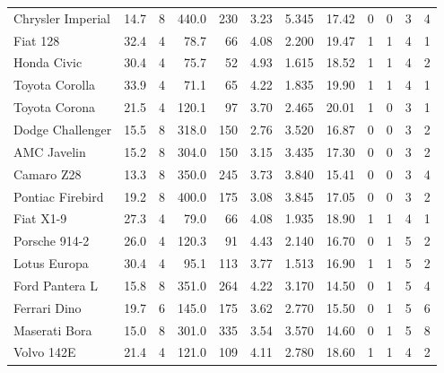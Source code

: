 \documentclass[aoas]{imsart}
\numberwithin{equation}{section}
\theoremstyle{plain}
\theoremstyle{remark}
\begin{document}
\begin{table}
\begin{tabular}[t]{lrrrrrrrrrrr}
Chrysler Imperial & 14.7 & 8 & 440.0 & 230 & 3.23 & 5.345 & 17.42 & 0 & 0 & 3 & 4\\
Fiat 128 & 32.4 & 4 & 78.7 & 66 & 4.08 & 2.200 & 19.47 & 1 & 1 & 4 & 1\\
Honda Civic & 30.4 & 4 & 75.7 & 52 & 4.93 & 1.615 & 18.52 & 1 & 1 & 4 & 2\\
Toyota Corolla & 33.9 & 4 & 71.1 & 65 & 4.22 & 1.835 & 19.90 & 1 & 1 & 4 & 1\\
Toyota Corona & 21.5 & 4 & 120.1 & 97 & 3.70 & 2.465 & 20.01 & 1 & 0 & 3 & 1\\
Dodge Challenger & 15.5 & 8 & 318.0 & 150 & 2.76 & 3.520 & 16.87 & 0 & 0 & 3 & 2\\
AMC Javelin & 15.2 & 8 & 304.0 & 150 & 3.15 & 3.435 & 17.30 & 0 & 0 & 3 & 2\\
Camaro Z28 & 13.3 & 8 & 350.0 & 245 & 3.73 & 3.840 & 15.41 & 0 & 0 & 3 & 4\\
Pontiac Firebird & 19.2 & 8 & 400.0 & 175 & 3.08 & 3.845 & 17.05 & 0 & 0 & 3 & 2\\
Fiat X1-9 & 27.3 & 4 & 79.0 & 66 & 4.08 & 1.935 & 18.90 & 1 & 1 & 4 & 1\\
Porsche 914-2 & 26.0 & 4 & 120.3 & 91 & 4.43 & 2.140 & 16.70 & 0 & 1 & 5 & 2\\
Lotus Europa & 30.4 & 4 & 95.1 & 113 & 3.77 & 1.513 & 16.90 & 1 & 1 & 5 & 2\\
Ford Pantera L & 15.8 & 8 & 351.0 & 264 & 4.22 & 3.170 & 14.50 & 0 & 1 & 5 & 4\\
Ferrari Dino & 19.7 & 6 & 145.0 & 175 & 3.62 & 2.770 & 15.50 & 0 & 1 & 5 & 6\\
Maserati Bora & 15.0 & 8 & 301.0 & 335 & 3.54 & 3.570 & 14.60 & 0 & 1 & 5 & 8\\
Volvo 142E & 21.4 & 4 & 121.0 & 109 & 4.11 & 2.780 & 18.60 & 1 & 1 & 4 & 2\\
\hline
\end{tabular}
\end{table}
\end{document}
